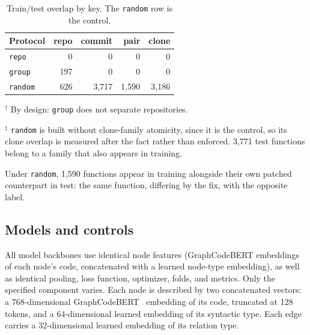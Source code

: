 \begin{table}[h]
\centering
\caption{Train/test overlap by key. The \texttt{random} row is the control.}
\label{tab:audit}
\begin{tabular}{lrrrr}
\toprule
\textbf{Protocol} & \textbf{repo} & \textbf{commit} & \textbf{pair} & \textbf{clone} \\
\midrule
\texttt{repo}   & 0 & 0 & 0 & 0 \\
\texttt{group}  & 197\rlap{$^\dagger$} & 0 & 0 & 0 \\
\texttt{random} & 626 & 3,717 & 1,590 & 3,186\rlap{$^\ddagger$} \\
\bottomrule
\end{tabular}
\begin{tablenotes}\footnotesize
\item $^\dagger$ By design: \texttt{group} does not separate repositories.
\item $^\ddagger$ \texttt{random} is built without clone-family atomicity, since
it is the control, so its clone overlap is measured after the fact rather than
enforced. 3,771 test functions belong to a family that also appears in training.
\item Under \texttt{random}, 1,590 functions appear in training alongside their
own patched counterpart in test: the same function, differing by the fix, with
the opposite label.
\end{tablenotes}
\end{table}


\subsection{Models and controls}
All model backbones use identical node features (GraphCodeBERT embeddings of each node's code, concatenated with a learned node-type embedding), as well as identical pooling, loss function, optimizer, folds, and metrics. Only the specified component varies. Each node is described by two concatenated vectors: a 768-dimensional GraphCodeBERT~\citep{guo2021graphcodebertpretrainingcoderepresentations} embedding of its code, truncated at 128 tokens, and a 64-dimensional learned embedding of its syntactic type. Each edge carries a 32-dimensional learned embedding of its relation type.

